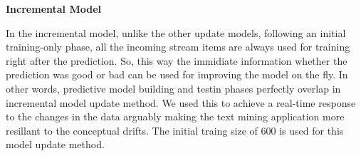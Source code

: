 \begin{center} \textbf{\huge Incremental Model} \end{center}
In the incremental model, unlike the other update models, following an initial training-only phase, all the incoming stream items are always used for training right after the prediction. So, this way the immidiate information whether the prediction was good or bad can be used for improving the model on the fly. In other words, predictive model building and testin phases perfectly overlap in incremental model update method. We used this to achieve a real-time response to the changes in the data arguably making the text mining application more resillant to the conceptual drifts. The initial traing size of 600 is used for this model update method.